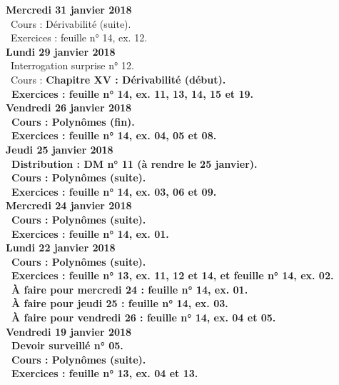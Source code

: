 \documentclass[12pt,a4paper]{article}
\begin{document}
\noindent\textbf{Mercredi 31 janvier 2018} \\
\bu\ Cours : Dérivabilité (suite).\\
\bu\ Exercices : feuille n° 14, ex. 12.\vspace{.4cm}\\

\noindent\textbf{Lundi 29 janvier 2018} \\
\bu\ Interrogation surprise n° 12.\\
\bu\ Cours : \bf Chapitre XV \rm : Dérivabilité (début).\\
\bu\ Exercices : feuille n° 14, ex. 11, 13, 14, 15 et 19.\vspace{.4cm}\\

\noindent\textbf{Vendredi 26 janvier 2018}\\
\bu\ Cours : Polynômes (fin).\\
\bu\ Exercices : feuille n° 14, ex. 04, 05 et 08.\vspace{.4cm}\\

\noindent\textbf{Jeudi 25 janvier 2018}\\
\bu\ Distribution : DM n° 11 (à rendre le 25 janvier).\\
\bu\ Cours : Polynômes (suite).\\
\bu\ Exercices : feuille n° 14, ex. 03, 06 et 09.\vspace{.4cm}\\

\noindent\textbf{Mercredi 24 janvier 2018} \\
\bu\ Cours : Polynômes (suite).\\
\bu\ Exercices : feuille n° 14, ex. 01.\vspace{.4cm}\\

\noindent\textbf{Lundi 22 janvier 2018} \\
\bu\ Cours : Polynômes (suite).\\
\bu\ Exercices : feuille n° 13, ex. 11, 12 et 14, et feuille n° 14, ex. 02.\\
\bu\ À faire pour mercredi 24 : feuille n° 14, ex. 01.\\
\bu\ À faire pour jeudi 25 : feuille n° 14, ex. 03.\\
\bu\ À faire pour vendredi 26 : feuille n° 14, ex. 04 et 05.\vspace{.4cm}\\

\noindent\textbf{Vendredi 19 janvier 2018}\\
\bu\ Devoir surveillé n° 05.\\
\bu\ Cours : Polynômes (suite).\\
\bu\ Exercices : feuille n° 13, ex. 04 et 13.\vspace{.4cm}\\
\end{document}
